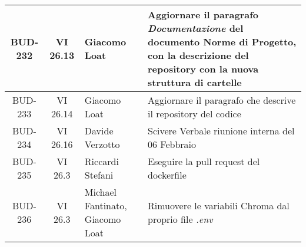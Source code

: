 \begin{table}[htbp]
\begin{tabular}{|c|c|p{}|p{}|}
    \hline
    BUD-232 & VI 26.13 & Giacomo Loat & Aggiornare il paragrafo \emph{Documentazione} del documento Norme di Progetto, con la descrizione del repository con la nuova struttura di cartelle \\
    \hline
    BUD-233 & VI 26.14 & Giacomo Loat & Aggiornare il paragrafo che descrive il repository del codice \\
    \hline
    BUD-234 & VI 26.16 & Davide Verzotto & Scivere Verbale riunione interna del 06 Febbraio \\
    \hline
    BUD-235 & VI 26.3 & Riccardi Stefani & Eseguire la pull request del dockerfile \\
    \hline
    BUD-236 & VI 26.3 & Michael Fantinato, Giacomo Loat & Rimuovere le variabili Chroma dal proprio file \emph{.env} \\
    \hline
\end{tabular}
\end{table}